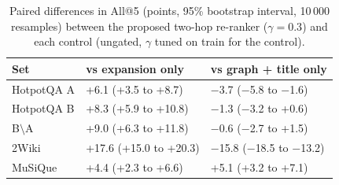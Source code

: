 \begin{table}[t]
\centering
\small
\caption{Paired differences in All@5 (points, 95\% bootstrap interval, 10\,000 resamples) between the proposed two-hop re-ranker ($\gamma=0.3$) and each control (ungated, $\gamma$ tuned on train for the control).}
\label{tab:ctlsig}
\begin{tabular}{lll}
\toprule
Set & vs expansion only & vs graph + title only \\
\midrule
HotpotQA A & +6.1 (+3.5 to +8.7) & $-$3.7 ($-$5.8 to $-$1.6) \\
HotpotQA B & +8.3 (+5.9 to +10.8) & $-$1.3 ($-$3.2 to +0.6) \\
B$\setminus$A & +9.0 (+6.3 to +11.8) & $-$0.6 ($-$2.7 to +1.5) \\
2Wiki & +17.6 (+15.0 to +20.3) & $-$15.8 ($-$18.5 to $-$13.2) \\
MuSiQue & +4.4 (+2.3 to +6.6) & +5.1 (+3.2 to +7.1) \\
\bottomrule
\end{tabular}
\end{table}
